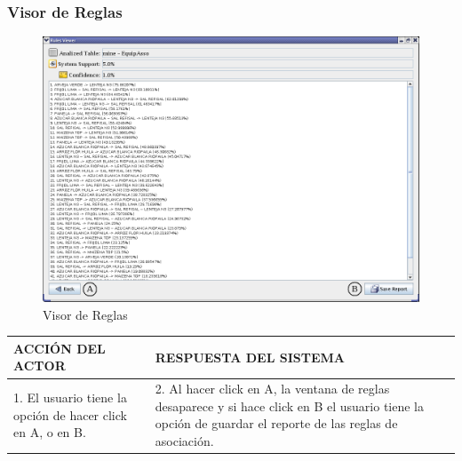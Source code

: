 \subsubsection{Visor de Reglas}
\begin{figure}[h]
 \centering
 \includegraphics[width=1\textwidth]{images/v0r.png}
 \caption{Visor de Reglas}
\end{figure}

\begin{center}
\begin{tabular}{|p{60mm}|p{60mm}|}\hline
ACCI\'ON DEL ACTOR & RESPUESTA DEL SISTEMA \\ \hline
1. El usuario tiene la opci\'on de hacer click en A, o en B.
& 2. Al hacer click en A, la ventana de reglas desaparece y si hace click en B el usuario tiene la opci\'on de guardar
el reporte de las reglas de asociaci\'on. \\ \hline
\end{tabular}
\end{center}
